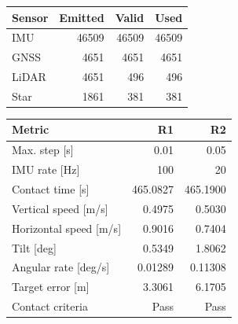 \noindent\begin{minipage}[t]{.45\linewidth}
\centering\small
{}\label{tab:app-sensor-counts}
\setlength{\tabcolsep}{3pt}
\begin{tabular}{@{}lrrr@{}}
\toprule
Sensor & Emitted & Valid & Used \\
\midrule
IMU & 46509 & 46509 & 46509 \\
GNSS & 4651 & 4651 & 4651 \\
LiDAR & 4651 & 496 & 496 \\
Star & 1861 & 381 & 381 \\
\bottomrule
\end{tabular}
\end{minipage}\hfill
\begin{minipage}[t]{.51\linewidth}
\centering\small
{}\label{tab:app-variant}
\setlength{\tabcolsep}{3pt}
\begin{tabularx}{\linewidth}{@{}Xrr@{}}
\toprule
Metric & R1 & R2 \\
\midrule
Max. step [s] & 0.01 & 0.05 \\
IMU rate [Hz] & 100 & 20 \\
Contact time [s] & 465.0827 & 465.1900 \\
Vertical speed [m/s] & 0.4975 & 0.5030 \\
Horizontal speed [m/s] & 0.9016 & 0.7404 \\
Tilt [deg] & 0.5349 & 1.8062 \\
Angular rate [deg/s] & 0.01289 & 0.11308 \\
Target error [m] & 3.3061 & 6.1705 \\
Contact criteria & Pass & Pass \\
\bottomrule
\end{tabularx}
\end{minipage}\par

